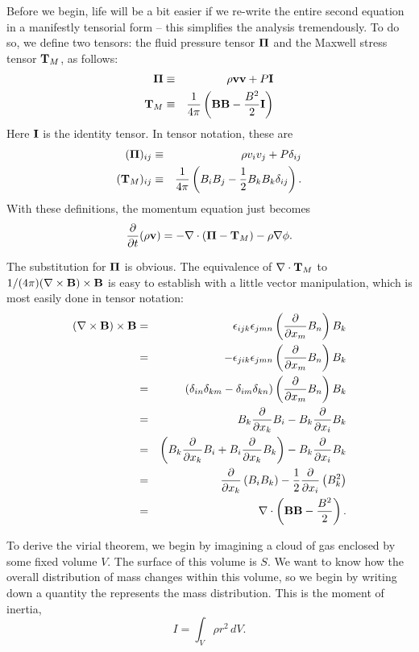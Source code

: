 Before we begin, life will be a bit easier if we re-write the entire second equation in a manifestly tensorial form -- this simplifies the analysis tremendously. To do so, we define two tensors: the fluid pressure tensor $\boldsymbol{\Pi}$ and the Maxwell stress tensor $\mathbf{T}_M$, as follows:
\begin{eqnarray}
\boldsymbol{\Pi} & \equiv & \rho \mathbf{v}\mathbf{v} + P\mathbf{I} \\
\mathbf{T}_M & \equiv & \frac{1}{4\pi} \left(\mathbf{B}\mathbf{B} - \frac{B^2}{2}\mathbf{I}\right)
\end{eqnarray}
Here $\mathbf{I}$ is the identity tensor. In tensor notation, these are
\begin{eqnarray}
(\boldsymbol{\Pi})_{ij} & \equiv & \rho v_i v_j + P \delta_{ij} \\
(\mathbf{T}_M)_{ij} & \equiv & \frac{1}{4\pi} \left(B_i B_j - \frac{1}{2}B_k B_k \delta_{ij}\right).
\end{eqnarray}
With these definitions, the momentum equation just becomes
\begin{equation}
\frac{\partial}{\partial t}(\rho \mathbf{v}) = -\nabla\cdot(\boldsymbol{\Pi}-\mathbf{T}_M) - \rho \nabla\phi.
\end{equation}

The substitution for $\boldsymbol{\Pi}$ is obvious. The equivalence of $\nabla\cdot\mathbf{T}_M$ to $1/(4\pi) (\nabla\times\mathbf{B})\times\mathbf{B}$ is easy to establish with a little vector manipulation, which is most easily done in tensor notation:
\begin{eqnarray}
(\nabla\times\mathbf{B})\times\mathbf{B} & = & \epsilon_{ijk} \epsilon_{jmn} \left(\frac{\partial}{\partial x_m}B_n\right) B_k \\
& = & -\epsilon_{jik} \epsilon_{jmn} \left(\frac{\partial}{\partial x_m}B_n\right) B_k \\
& = & (\delta_{in}\delta_{km}-\delta_{im}\delta_{kn})\left(\frac{\partial}{\partial x_m}B_n\right) B_k \\
& = & B_k\frac{\partial}{\partial x_k} B_i - B_k\frac{\partial}{\partial x_i} B_k \\
& = & \left(B_k\frac{\partial}{\partial x_k} B_i + B_i \frac{\partial}{\partial x_k} B_k\right) - B_k\frac{\partial}{\partial x_i} B_k \\
& = & \frac{\partial}{\partial x_k}\left(B_i B_k\right) -\frac{1}{2} \frac{\partial}{\partial x_i} \left(B_k^2\right)\\
& = & \nabla\cdot \left(\mathbf{B}\mathbf{B} - \frac{B^2}{2}\right).
\end{eqnarray}

To derive the virial theorem, we begin by imagining a cloud of gas enclosed by some fixed volume $V$. The surface of this volume is $S$. We want to know how the overall distribution of mass changes within this volume, so we begin by writing down a quantity the represents the mass distribution. This is the moment of inertia,
\begin{equation}
I = \int_V \rho r^2\, dV.
\end{equation}

